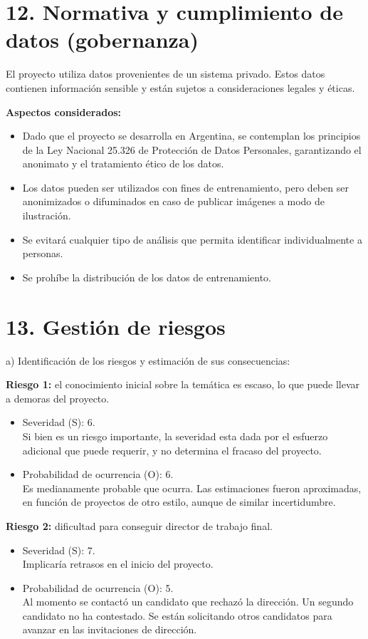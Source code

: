 \documentclass[
11pt, %
]{charter}
\begin{document}
\section{12. Normativa y cumplimiento de datos (gobernanza)}

El proyecto utiliza datos provenientes de un sistema privado. Estos datos contienen información sensible y están sujetos a consideraciones legales y éticas.

\textbf{Aspectos considerados:}
\begin{itemize}
  \item Dado que el proyecto se desarrolla en Argentina, se contemplan los principios de la
Ley Nacional 25.326 de Protección de Datos Personales, garantizando el anonimato y
el tratamiento ético de los datos.
  \item Los datos pueden ser utilizados con fines de entrenamiento, pero deben ser anonimizados o difuminados en caso de publicar imágenes a modo de ilustración.
  \item Se evitará cualquier tipo de análisis que permita identificar individualmente a personas.
  \item Se prohíbe la distribución de los datos de entrenamiento.
\end{itemize}

\newpage
\section{13. Gestión de riesgos}
\label{sec:riesgos}
a) Identificación de los riesgos y estimación de sus consecuencias:

\textbf{Riesgo 1:} el conocimiento inicial sobre la temática es escaso, lo que puede llevar a demoras del proyecto.
\begin{itemize}
	\item Severidad (S): 6. \\
	Si bien es un riesgo importante, la severidad esta dada por el esfuerzo adicional que puede requerir, y no determina el fracaso del proyecto.
	\item Probabilidad de ocurrencia (O): 6. \\
	Es medianamente probable que ocurra. Las estimaciones fueron aproximadas, en función de proyectos de otro estilo, aunque de similar incertidumbre. 
\end{itemize}   

\textbf{Riesgo 2:} dificultad para conseguir director de trabajo final.
\begin{itemize}
	\item Severidad (S): 7.\\
	Implicaría retrasos en el inicio del proyecto.
	\item Probabilidad de ocurrencia (O): 5.\\
	Al momento se contactó un candidato que rechazó la dirección. Un segundo candidato no ha contestado. Se están solicitando otros candidatos para avanzar en las invitaciones de dirección.
\end{itemize}   
\end{document}
